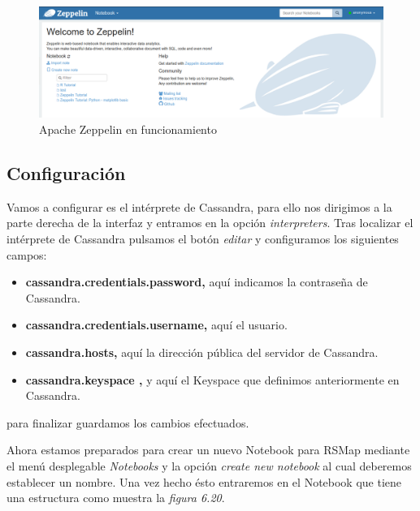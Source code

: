\begin{figure}[!ht]
  \begin{center}
    \includegraphics[scale=0.30]{../images/zeppelin/1.png}
		\caption{Apache Zeppelin en funcionamiento}
    \label{fig:kaa}
	\end{center}
\end{figure}

\subsection{Configuración}

Vamos a configurar es el intérprete de Cassandra, para ello nos dirigimos a la parte derecha de la interfaz y entramos en la opción \textit{interpreters}. Tras localizar el intérprete de Cassandra pulsamos el botón \textit{editar} y configuramos los siguientes campos:

\begin{itemize}
\item \textbf{cassandra.credentials.password, } aquí indicamos la contraseña de Cassandra.
\item \textbf{cassandra.credentials.username, } aquí el usuario.
\item \textbf{cassandra.hosts, } aquí la dirección pública del servidor de Cassandra.
\item \textbf{cassandra.keyspace , } y aquí el Keyspace que definimos anteriormente en Cassandra.
\end{itemize}

para finalizar guardamos los cambios efectuados.

Ahora estamos preparados para crear un nuevo Notebook para RSMap mediante el menú desplegable \textit{Notebooks} y la opción \textit{create new notebook} al cual deberemos establecer un nombre. Una vez hecho ésto entraremos en el Notebook que tiene una estructura como muestra la \textit{figura 6.20}.

